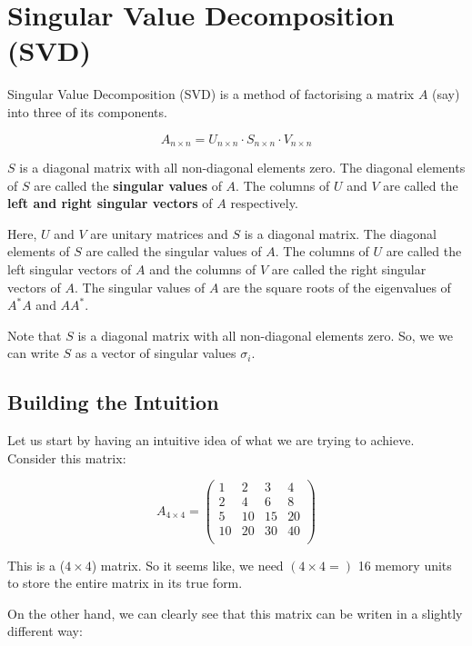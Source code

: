 \section{Singular Value Decomposition (SVD)}

	Singular Value Decomposition (SVD) is a method of factorising a matrix $A$ (say) into three of its components.

	$$A_{n\times n} = U_{n\times n}\cdot S_{n\times n}\cdot V_{n\times n}$$

	$S$ is a diagonal matrix with all non-diagonal elements zero. The diagonal elements of $S$ are called the \textbf{singular values} of $A$. The columns of $U$ and $V$ are called the \textbf{left and right singular vectors} of $A$ respectively.

	Here, $U$ and $V$ are unitary matrices and $S$ is a diagonal matrix. The diagonal elements of $S$ are called the singular values of $A$. The columns of $U$ are called the left singular vectors of $A$ and the columns of $V$ are called the right singular vectors of $A$. The singular values of $A$ are the square roots of the eigenvalues of $A^*A$ and $A A^*$.

	Note that $S$ is a diagonal matrix with all non-diagonal elements zero. So, we we can write $S$ as a vector of singular values $\sigma_i$.

	\subsection{Building the Intuition}

		Let us start by having an intuitive idea of what we are trying to achieve. Consider this matrix:

		$$
		A_{4\times4} = 
		\left(
		\begin{matrix}
			1 & 2 & 3 & 4\\
			2 & 4 & 6 & 8\\
			5 & 10 & 15 & 20\\
			10 & 20 & 30 & 40\\
		\end{matrix}
		\right)
		$$

		This is a ($4\times4$) matrix. So it seems like, we need $(4\times4 = )$ 16 memory units to store the entire matrix in its true form. 
		
		On the other hand, we can clearly see that this matrix can be writen in a slightly different way:

